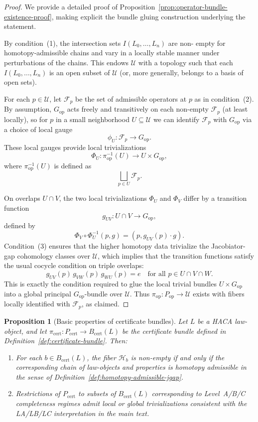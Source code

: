 \documentclass[11pt]{book}
\theoremstyle{plain}
\newtheorem{proposition}[theorem]{Proposition}
\theoremstyle{definition}
\theoremstyle{remark}
\begin{document}
\begin{proof}
We provide a detailed proof of Proposition~\ref{prop:operator-bundle-existence-proof}, making explicit the bundle gluing construction underlying the statement.

By condition~(1), the intersection sets $I(L_0,\dots,L_n)$ are non-
empty for homotopy-admissible chains and vary in a locally stable
manner under perturbations of the chains. This endows $\mathcal{U}$
with a topology such that each $I(L_0,\dots,L_n)$ is an open subset of
$\mathcal{U}$ (or, more generally, belongs to a basis of open sets).

For each $p\in\mathcal{U}$, let $\mathcal{F}_p$ be the set of
admissible operators at $p$ as in condition~(2). By assumption,
$G_{\mathrm{op}}$ acts freely and transitively on each non-empty
$\mathcal{F}_p$ (at least locally), so for $p$ in a small neighborhood
$U\subseteq\mathcal{U}$ we can identify $\mathcal{F}_p$ with
$G_{\mathrm{op}}$ via a choice of local gauge
\[
  \phi_U:\mathcal{F}_p\to G_{\mathrm{op}}.
\]
These local gauges provide local trivializations
\[
  \Phi_U:\pi_{\mathrm{op}}^{-1}(U)\to U\times G_{\mathrm{op}},
\]
where $\pi_{\mathrm{op}}^{-1}(U)$ is defined as
\[
  \bigsqcup_{p\in U}\mathcal{F}_p.
\]

On overlaps $U\cap V$, the two local trivializations $\Phi_U$ and
$\Phi_V$ differ by a transition function
\[
  g_{UV}:U\cap V\to G_{\mathrm{op}},
\]
defined by
\[
  \Phi_V\circ \Phi_U^{-1}(p,g) = (p,g_{UV}(p)\cdot g).
\]
Condition~(3) ensures that the higher homotopy data trivialize the
Jacobiator-gap cohomology classes over $\mathcal{U}$, which implies
that the transition functions satisfy the usual cocycle condition on
triple overlaps:
\[
  g_{UV}(p)\,g_{VW}(p)\,g_{WU}(p)=e
  \quad\text{for all }p\in U\cap V\cap W.
\]
This is exactly the condition required to glue the local trivial
bundles $U\times G_{\mathrm{op}}$ into a global principal
$G_{\mathrm{op}}$-bundle over $\mathcal{U}$. Thus
$\pi_{\mathrm{op}}:P_{\mathrm{op}}\to\mathcal{U}$ exists with fibers
locally identified with $\mathcal{F}_p$, as claimed.
\end{proof}

\begin{proposition}[Basic properties of certificate bundles]
\label{prop:certificate-bundle-properties}
Let $L$ be a HACA law-object, and let
$\pi_{\mathrm{cert}}:P_{\mathrm{cert}}\to B_{\mathrm{cert}}(L)$ be the
certificate bundle defined in
Definition~\ref{def:certificate-bundle}. Then:
\begin{enumerate}
  \item For each $b\in B_{\mathrm{cert}}(L)$, the fiber
        $\mathcal{H}_b$ is non-empty if and only if the corresponding
        chain of law-objects and properties is homotopy admissible in
        the sense of Definition~\ref{def:homotopy-admissible-jgap}.
  \item Restrictions of $P_{\mathrm{cert}}$ to subsets of
        $B_{\mathrm{cert}}(L)$ corresponding to Level~A/B/C completeness
        regimes admit local or global trivializations consistent with
        the LA/LB/LC interpretation in the main text.
\end{enumerate}
\end{proposition}
\end{document}
